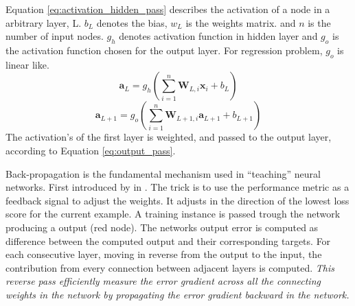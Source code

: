Equation \eqref{eq:activation_hidden_pass} describes the activation of a node in a arbitrary layer, L. $b_L$ denotes the bias, $w_L$ is the weights matrix. and $n$ is the number of input nodes. $g_h$ denotes activation function in hidden layer and $g_o$ is the activation function chosen for the output layer. For regression problem, $g_o$ is linear like.
\begin{equation} \label{eq:activation_hidden_pass}
    \textbf{a}_L = g_h(\sum_{i=1}^n \textbf{W}_{L, i} \textbf{x}_i + b_L)
\end{equation}
\begin{equation} \label{eq:output_pass}
    \textbf{a}_{L+1} = g_o(\sum_{i=1}^n \textbf{W}_{L+1, i} \textbf{a}_{L+1} + b_{L+1})
\end{equation}
The activation's of the first layer is weighted, and passed to the output layer, according to Equation \eqref{eq:output_pass}.

Back-propagation is the fundamental mechanism used in ``teaching'' neural networks. First introduced by \citeauthor{RumelhartBackProp} in \citeyear{RumelhartBackProp}. The trick is to use the performance metric as a feedback signal to adjust the weights. It adjusts in the direction of the lowest loss score for the current example. A training instance is passed trough the network producing a output (red node). The networks output error is computed as difference between the computed output and their corresponding targets. For each consecutive layer, moving in reverse from the output to the input, the contribution from every connection between adjacent layers is computed. \textit{This reverse pass efficiently measure the error gradient across all the connecting weights in the network by propagating the error gradient backward in the network. }


